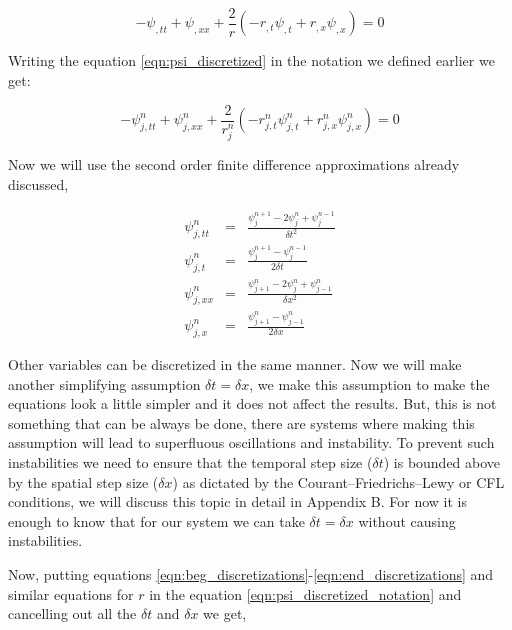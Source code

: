 \begin{equation}
    -\psi_{, t t}+\psi_{, x x}+\frac{2}{r}\left(-r_{, t} \psi_{, t}+r_{, x} \psi_{, x}\right)=0
    \label{eqn:psi_discretized}
\end{equation}

Writing the equation \ref{eqn:psi_discretized} in the notation we defined earlier we get:

\begin{equation}
    -\psi^n_{j, t t}+\psi^n_{j, x x}+\frac{2}{r^n_j}\left(-r^n_{j, t} \psi^n_{j, t}+r^n_{j, x} \psi^n_{j, x}\right)=0
    \label{eqn:psi_discretized_notation}
\end{equation}

Now we will use the second order finite difference approximations already discussed,

\begin{eqnarray}
    \label{eqn:beg_discretizations}
    \psi^n_{j,tt} &=& \frac{\psi^{n+1}_j - 2 \psi^{n}_j + \psi^{n-1}_j}{\delta t^2} \\
    \psi^n_{j,t} &=& \frac{\psi^{n+1}_j -  \psi^{n-1}_j}{2\delta t} \\
    \psi^n_{j,xx} &=& \frac{\psi^{n}_{j+1} - 2 \psi^{n}_j + \psi^{n}_{j-1}}{\delta x^2} \\
    \psi^n_{j,x} &=& \frac{\psi^{n}_{j+1} -  \psi^{n}_{j-1}}{2\delta x}
    \label{eqn:end_discretizations}
\end{eqnarray}

Other variables can be discretized in the same manner. Now we will make another simplifying assumption $\delta t = \delta x$, we make this assumption to make the equations look a little simpler and it does not affect the results. But, this is not something that can be always be done, there are systems where making this assumption will lead to  superfluous oscillations and instability. To prevent such instabilities we need to ensure that the temporal step size ($\delta t$) is bounded above by the spatial step size ($\delta x$) as dictated by the Courant–Friedrichs–Lewy or CFL conditions, we will discuss this topic in detail in Appendix B. For now it is enough to know that for our system we can take $\delta t = \delta x$ without causing instabilities.


Now, putting equations \ref{eqn:beg_discretizations}-\ref{eqn:end_discretizations} and similar equations for $r$ in the equation \ref{eqn:psi_discretized_notation} and cancelling out all the $\delta t$ and $\delta x$ we get,

